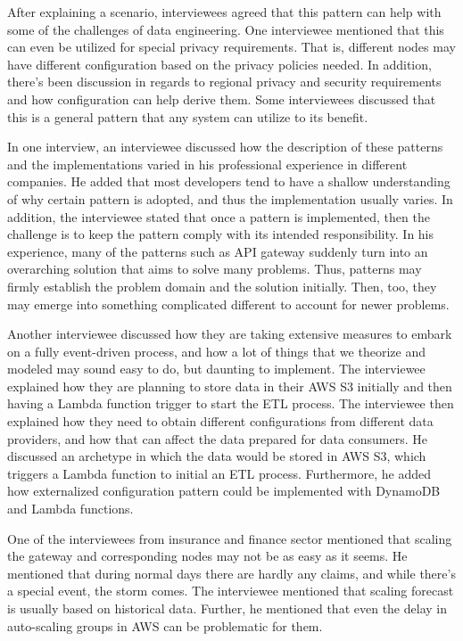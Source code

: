 \documentclass{bmcart}
\begin{document}



After explaining a scenario, interviewees agreed that this pattern can help with some of the challenges of data engineering. One interviewee mentioned that this can even be utilized for special privacy requirements. That is, different nodes may have different configuration based on the privacy policies needed. In addition, there's been discussion in regards to regional privacy and security requirements and how configuration can help derive them. Some interviewees discussed that this is a general pattern that any system can utilize to its benefit. 

In one interview, an interviewee discussed how the description of these patterns and the implementations varied in his professional experience in different companies. He added that most developers tend to have a shallow understanding of why certain pattern is adopted, and thus the implementation usually varies. In addition, the interviewee stated that once a pattern is implemented, then the challenge is to keep the pattern comply with its intended responsibility. In his experience, many of the patterns such as API gateway suddenly turn into an overarching solution that aims to solve many problems. Thus, patterns may firmly establish the problem domain and the solution initially. Then, too, they may emerge into something complicated different to account for newer problems. 

Another interviewee discussed how they are taking extensive measures to embark on a fully event-driven process, and how a lot of things that we theorize and modeled may sound easy to do, but daunting to implement. The interviewee explained how they are planning to store data in their AWS S3 initially and then having a Lambda function trigger to start the ETL process. The interviewee then explained how they need to obtain different configurations from different data providers, and how that can affect the data prepared for data consumers. He discussed an archetype in which the data would be stored in AWS S3, which triggers a Lambda function to initial an ETL process. Furthermore, he added how externalized configuration pattern could be implemented with DynamoDB and Lambda functions.

One of the interviewees from insurance and finance sector mentioned that scaling the gateway and corresponding nodes may not be as easy as it seems. He mentioned that during normal days there are hardly any claims, and while there's a special event, the storm comes. The interviewee mentioned that scaling forecast is usually based on historical data. Further, he mentioned that even the delay in auto-scaling groups in AWS can be problematic for them. 
\end{document}
